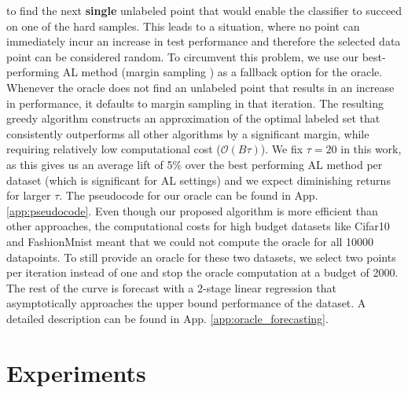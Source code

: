 \documentclass[]{article}
\newcommand{\LL}{\mathcal{L}}
\begin{document}
to find the next \textbf{single} unlabeled point that would enable the
classifier to succeed on one of the hard samples. This leads to a situation,
where no point can immediately incur an increase in test performance and
therefore the selected data point can be considered random. To circumvent this
problem, we use our best-performing AL method (margin sampling
\cite{wang2014new}) as a fallback option for the oracle. Whenever the oracle
does not find an unlabeled point that results in an increase in performance, it
defaults to margin sampling in that iteration. The resulting greedy algorithm
constructs an approximation of the optimal labeled set that consistently
outperforms all other algorithms by a significant margin, while requiring
relatively low computational cost ($\mathcal{O}(B\tau)$).
We fix $\tau = 20$ in this work, as this gives us an average lift of 5\% over the
best performing AL method per dataset (which is significant for AL
settings) and we expect diminishing returns for larger $\tau$. The pseudocode
for our oracle can be found in App. \ref{app:pseudocode}.
Even though our proposed algorithm is more efficient than other approaches, the
computational costs for high budget datasets like Cifar10 and FashionMnist meant
that we could not compute the oracle for all 10000 datapoints. To still provide
an oracle for these two datasets, we select two points per iteration instead of
one and stop the oracle computation at a budget of 2000. The rest of the curve
is forecast with a 2-stage linear regression that asymptotically approaches the
upper bound performance of the dataset. A detailed description can be found in
App. \ref{app:oracle_forecasting}.


\section{Experiments}
\end{document}
